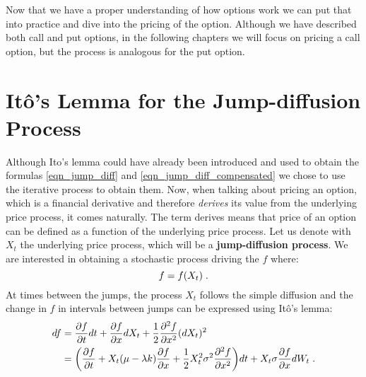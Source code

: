 \documentclass[times, utf8, diplomski]{fer}
\begin{document}
\noindent Now that we have a proper understanding of how options work we can put that into practice and dive into the pricing of the option. Although we have described both call and put options, in the following chapters we will focus on pricing a call option, but the process is analogous for the put option. 

\section{It\^{o}'s Lemma for the Jump-diffusion Process}
Although Ito's lemma could have already been introduced and used to obtain the formulas \ref{eqn_jump_diff} and \ref{eqn_jump_diff_compensated} we chose to use the iterative process to obtain them. Now, when talking about pricing an option, which is a financial derivative and therefore \textit{derives} its value from the underlying price process, it comes naturally. The term derives means that price of an option can be defined as a function of the underlying price process. Let us denote with $X_t$ the underlying price process, which will be a \textbf{jump-diffusion process}. We are interested in obtaining a stochastic process driving the $f$ where: $$ f = f(X_t) \hspace{0.1cm}.$$
At times between the jumps, the process $X_t$ follows the simple diffusion and the change in $f$ in intervals between jumps can be expressed using It\^{o}'s lemma: 
\begin{equation} \label{eqn_diff_part}
\begin{split}
	df &= \frac{\partial f}{\partial t}dt + \frac{\partial f}{\partial x}dX_t + \frac{1}{2}\frac{\partial^2f}{\partial x^2}(dX_t)^2 \\
	   &= \bigg(\frac{\partial f}{\partial t} + X_t(\mu - \lambda k)\frac{\partial f}{\partial x} + \frac{1}{2}X_t^2\sigma^2\frac{\partial^2 f}{\partial x^2}\bigg)dt + X_t\sigma\frac{\partial f}{\partial x}dW_t \hspace{0.1cm}.
\end{split}
\end{equation}
\end{document}
